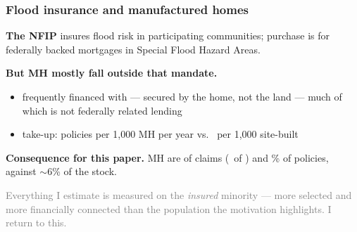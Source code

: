 \documentclass[11pt,xcolor={dvipsnames},hyperref={pdftex,pdfpagemode=UseNone,hidelinks,pdfdisplaydoctitle=true},usepdftitle=false,aspectratio=169]{beamer}
\newcommand{\gc}[1]{{\footnotesize\textcolor{gray}{#1}}}
\begin{document}
\begin{frame}
    \frametitle{Flood insurance and manufactured homes}

    \textbf{The NFIP} insures flood risk in participating communities; purchase is  for federally backed mortgages in Special Flood Hazard Areas.

    \vspace{0.8em}
    \pause

    \textbf{But MH mostly fall outside that mandate.}
    \begin{itemize}
        \item frequently financed with  --- secured by the home, not the land --- much of which is not federally related lending
        \item take-up: \al{\vPolMhPre} policies per 1,000 MH per year vs.\ \al{\vPolSbPre} per 1,000 site-built
    \end{itemize}

    \vspace{0.8em}
    \pause

    \textbf{Consequence for this paper.} MH are \al{\vMhClaimSharePct\%} of claims (\vNMhClaims\ of \vNAllClaims) and \vMhPolicySharePct\% of policies, against $\sim$6\% of the stock.

    \vspace{0.4em}

    \gc{Everything I estimate is measured on the \emph{insured} minority --- more selected and more financially connected than the population the motivation highlights. I return to this.}

\end{frame}
\end{document}
